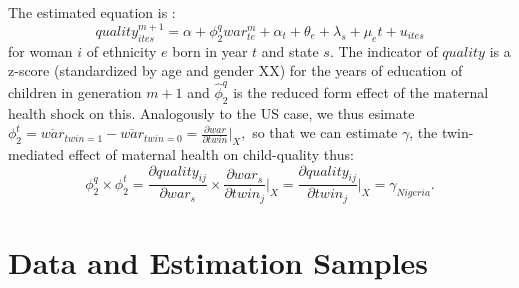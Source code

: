 \documentclass[subeqn]{article}
\begin{document}
\begin{spacing}{1.4}
The estimated equation is :
\begin{equation}
  \label{TWINeqn:Nigeria}
  quality^{m+1}_{ites} = \alpha + \phi_2^q war^m_{te}+\alpha_t+\theta_e+\lambda_s+\mu_e t+u_{ites}
\end{equation}
for woman $i$ of ethnicity $e$ born in year $t$ and state $s$.  
The indicator of $quality$ is a z-score (standardized by age and gender XX) for the years of education of children in generation $m+1$ and $\hat\phi^q_2$ is the reduced form effect of the maternal health shock on this.  
Analogously to the US case, we thus esimate $\phi_2^t=\overline{war}_{twin=1}
-\overline{war}_{twin=0}=\frac{\partial war}{\partial twin}\bigg|_{X},$ so that we can estimate $\gamma$, the twin-mediated effect of
maternal health on child-quality thus:
\begin{equation}
  \label{TWINeqn:realgammaN}
  \phi_2^q\times\phi_2^t=\frac{\partial quality_{ij}}{\partial war_s}\times
  \frac{\partial war_s}{\partial twin_j}\bigg|_{X}=
  \frac{\partial quality_{ij}}{\partial twin_j}\bigg|_{X}=\gamma_{Nigeria}.
\end{equation}


\section{Data and Estimation Samples}              \label{TWINscn:data}

\end{spacing}
\end{document}
